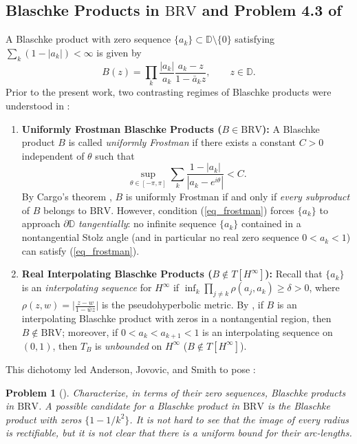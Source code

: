 \documentclass[11pt,reqno]{amsart}
\newtheorem{prob}[thm]{Problem}
\numberwithin{equation}{section}
\newcommand{\D}{\mathbb{D}}
\newcommand{\BRV}{\mathrm{BRV}}
\begin{document}
\subsection{Blaschke Products in $\BRV$ and Problem 4.3 of \cite{AJS14}}

A Blaschke product with zero sequence $\{a_k\} \subset \D \setminus \{0\}$ satisfying $\sum_k (1 - |a_k|) < \infty$ is given by
\[
  B(z) = \prod_k \frac{|a_k|}{a_k} \frac{a_k - z}{1 - \bar{a}_k z}, \qquad z \in \D.
\]
Prior to the present work, two contrasting regimes of Blaschke products were understood in \cite{AJS14}:
\begin{enumerate}
\item \textbf{Uniformly Frostman Blaschke Products ($B \in \BRV$):} A Blaschke product $B$ is called \emph{uniformly Frostman} \cite[Eq.~(2.2)]{AJS14} if there exists a constant $C > 0$ independent of $\theta$ such that
\begin{equation} \label{eq_frostman}
  \sup_{\theta \in [-\pi, \pi]} \sum_k \frac{1 - |a_k|}{|a_k - e^{i\theta}|} < C.
\end{equation}
By Cargo's theorem \cite[Theorem~1]{Car61}, $B$ is uniformly Frostman if and only if \emph{every subproduct} of $B$ belongs to $\BRV$. However, condition (\ref{eq_frostman}) forces $\{a_k\}$ to approach $\partial\D$ \emph{tangentially}: no infinite sequence $\{a_k\}$ contained in a nontangential Stolz angle (and in particular no real zero sequence $0 < a_k < 1$) can satisfy (\ref{eq_frostman}).
\item \textbf{Real Interpolating Blaschke Products ($B \notin T[H^\infty]$):} Recall that $\{a_k\}$ is an \emph{interpolating sequence} for $H^\infty$ if $\inf_k \prod_{j \ne k} \rho(a_j, a_k) \ge \delta > 0$, where $\rho(z, w) = \bigl|\frac{z - w}{1 - \bar{w} z}\bigr|$ is the pseudohyperbolic metric. By \cite[Proposition~2.7 and Theorem~2.10]{AJS14}, if $B$ is an interpolating Blaschke product with zeros in a nontangential region, then $B \notin \BRV$; moreover, if $0 < a_k < a_{k+1} < 1$ is an interpolating sequence on $(0, 1)$, then $T_B$ is \emph{unbounded} on $H^\infty$ ($B \notin T[H^\infty]$).
\end{enumerate}

This dichotomy led Anderson, Jovovic, and Smith to pose \cite[Problem~4.3, p.~14]{AJS14}:
\begin{prob}[{\cite[Problem~4.3]{AJS14}}] \label{prob_4_3}
Characterize, in terms of their zero sequences, Blaschke products in $\BRV$. A possible candidate for a Blaschke product in $\BRV$ is the Blaschke product with zeros $\{1 - 1/k^2\}$. It is not hard to see that the image of every radius is rectifiable, but it is not clear that there is a uniform bound for their arc-lengths.
\end{prob}
\end{document}

